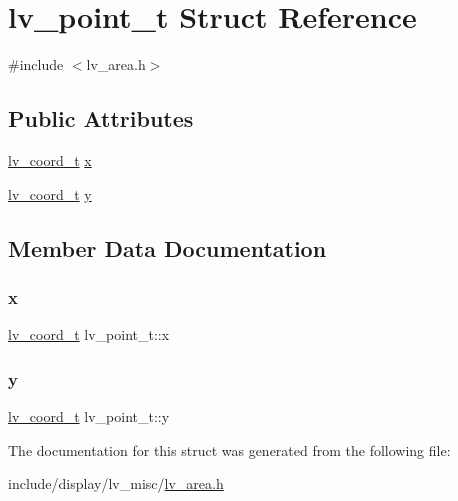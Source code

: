 \hypertarget{structlv__point__t}{}\section{lv\+\_\+point\+\_\+t Struct Reference}
\label{structlv__point__t}


{\ttfamily \#include $<$lv\+\_\+area.\+h$>$}

\subsection*{Public Attributes}
\begin{DoxyCompactItemize}
\item 
\mbox{\hyperlink{lv__area_8h_ad98932f5017f20988532bb68b32a6d76}{lv\+\_\+coord\+\_\+t}} \mbox{\hyperlink{structlv__point__t_adfa12860a9e02d054107cfcd4fde3d9e}{x}}
\item 
\mbox{\hyperlink{lv__area_8h_ad98932f5017f20988532bb68b32a6d76}{lv\+\_\+coord\+\_\+t}} \mbox{\hyperlink{structlv__point__t_a4f11b93689ca9ee0e57734726cf187c0}{y}}
\end{DoxyCompactItemize}


\subsection{Member Data Documentation}
\mbox{\label{structlv__point__t_adfa12860a9e02d054107cfcd4fde3d9e}} 
\subsubsection{\texorpdfstring{x}{x}}
{\footnotesize\ttfamily \mbox{\hyperlink{lv__area_8h_ad98932f5017f20988532bb68b32a6d76}{lv\+\_\+coord\+\_\+t}} lv\+\_\+point\+\_\+t\+::x}

\mbox{\label{structlv__point__t_a4f11b93689ca9ee0e57734726cf187c0}} 
\subsubsection{\texorpdfstring{y}{y}}
{\footnotesize\ttfamily \mbox{\hyperlink{lv__area_8h_ad98932f5017f20988532bb68b32a6d76}{lv\+\_\+coord\+\_\+t}} lv\+\_\+point\+\_\+t\+::y}



The documentation for this struct was generated from the following file\+:\begin{DoxyCompactItemize}
\item 
include/display/lv\+\_\+misc/\mbox{\hyperlink{lv__area_8h}{lv\+\_\+area.\+h}}\end{DoxyCompactItemize}
